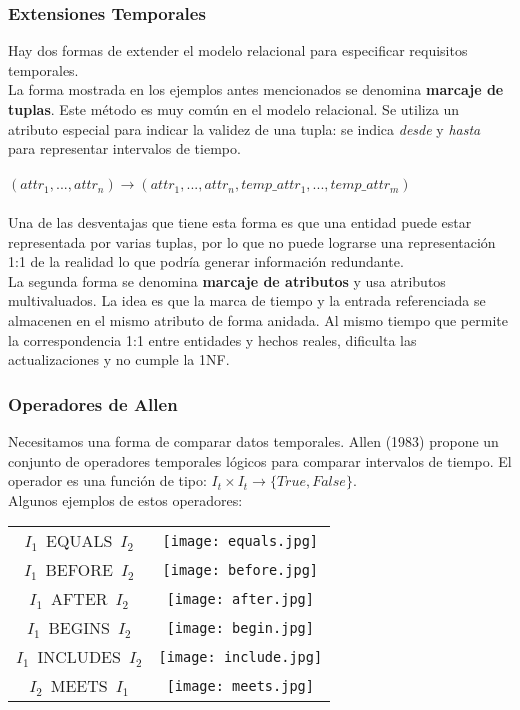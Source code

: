\documentclass[a4paper,12pt,oneside]{report}
\begin{document}
\subsubsection*{Extensiones Temporales}
Hay dos formas de extender el modelo relacional para especificar requisitos temporales.\\
La forma mostrada en los ejemplos antes mencionados se denomina \textbf{marcaje de tuplas}. Este m\'etodo es muy com\'un en el modelo relacional. Se utiliza un atributo especial para indicar la validez de una tupla: se indica \textit{desde} y \textit{hasta} para representar intervalos de tiempo.\\
\ \\
$(attr_1, ..., attr_n) \rightarrow (attr_1, ..., attr_n, temp\_attr_1, ..., temp\_attr_m)$\\
\ \\Una de las desventajas que tiene esta forma es que una entidad puede estar representada por varias tuplas, por lo que no puede lograrse una representaci\'on 1:1 de la realidad lo que podr\'ia generar informaci\'on redundante.\\
La segunda forma se denomina \textbf{marcaje de atributos} y usa atributos multivaluados. La idea es que la marca de tiempo y la entrada referenciada  se almacenen en el mismo atributo de forma anidada. Al mismo tiempo que permite la correspondencia 1:1 entre entidades y hechos reales, dificulta las actualizaciones y no cumple la 1NF.
\subsubsection*{Operadores de Allen}
Necesitamos una forma de comparar datos temporales. Allen (1983) propone un conjunto 	de operadores temporales l\'ogicos para comparar intervalos de tiempo. El operador es una funci\'on de tipo: $I_{t} \times I_{t} \rightarrow \lbrace True, False \rbrace$.\\
Algunos ejemplos de estos operadores:
\begin{center}
\begin{tabular}{cc}
$I_{1}$\ EQUALS\ $I_{2}$ & \texttt{[image: equals.jpg]}\\
$I_{1}$\ BEFORE\ $I_{2}$ & \texttt{[image: before.jpg]}\\
$I_{1}$\ AFTER\ $I_{2}$ & \texttt{[image: after.jpg]}\\
$I_{1}$\ BEGINS\ $I_{2}$ & \texttt{[image: begin.jpg]}\\
$I_{1}$\ INCLUDES\ $I_{2}$ & \texttt{[image: include.jpg]}\\
$I_{2}$\ MEETS\ $I_{1}$ & \texttt{[image: meets.jpg]}\\
\end{tabular}
\end{center}
\end{document}
